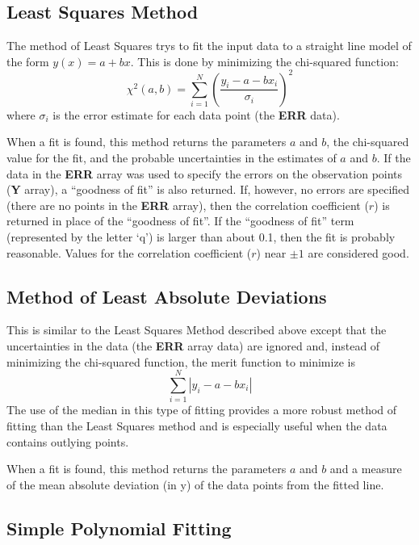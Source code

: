 \subsection*{Least Squares Method}

The method of Least Squares trys to fit the input data
to a straight line model of the form $y(x) = a + bx$.
This is done by minimizing the chi-squared function:
\[ \chi^2(a,b) = \sum_{i=1}^{N}\left(\frac{y_i - a - bx_i}{\sigma_i}\right)^2 \]
where $\sigma_i$ is the error estimate for each data point (the {\bf ERR} data).

When a fit is found, this method returns the parameters $a$ and $b$,
the chi-squared value for the fit, and the probable uncertainties in the
estimates of $a$ and $b$.
If the data in the {\bf ERR} array was used to specify the errors on
the observation points ({\bf Y} array), a ``goodness of fit'' is also returned.
If, however, no errors are specified (there are no points in the {\bf ERR}
array), then the correlation coefficient ($r$) is returned
in place of the ``goodness of fit''.
If the ``goodness of fit'' term (represented by the letter `q') is
larger than about 0.1, then the fit is probably reasonable.
Values for the correlation coefficient ($r$) near $\pm 1$ are considered good.

\subsection*{Method of Least Absolute Deviations}

This is similar to the Least Squares Method described above except that
the uncertainties in the data (the {\bf ERR} array data) are ignored and,
instead of minimizing the chi-squared function, the merit function to
minimize is
\[ \sum_{i=1}^{N} \left|y_i - a - bx_i\right| \]
The use of the median in this type of fitting provides a more robust method
of fitting than the Least Squares method and is especially
useful when the data contains outlying points.

When a fit is found, this method returns the parameters $a$ and $b$ and
a measure of the mean absolute deviation (in y) of the data points
from the fitted line.

\subsection*{Simple Polynomial Fitting}

